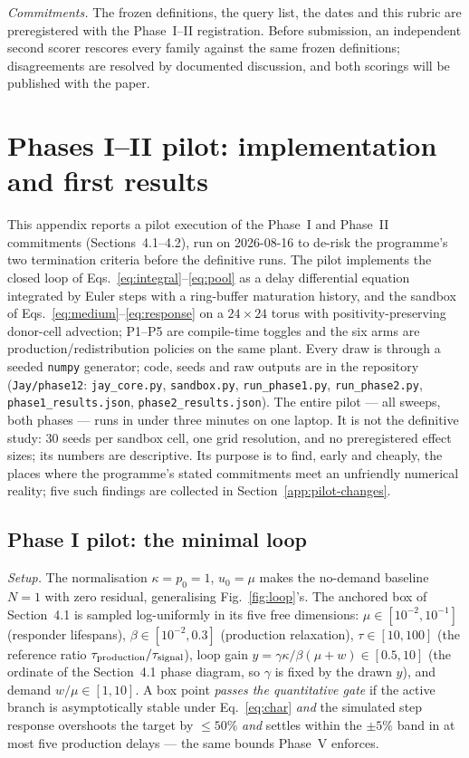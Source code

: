 \documentclass[twoside,twocolumn,usenatbib]{mnras}
\begin{document}
\emph{Commitments.} The frozen definitions, the query list, the dates
and this rubric are preregistered with the Phase~I--II registration.
Before submission, an independent second scorer rescores every family
against the same frozen definitions; disagreements are resolved by
documented discussion, and both scorings will be published with the
paper.

\section{Phases I--II pilot: implementation and first results}
\label{app:pilot}

This appendix reports a pilot execution of the Phase~I and Phase~II
commitments (Sections~4.1--4.2), run on 2026-08-16 to de-risk the
programme's two termination criteria before the definitive runs.  The
pilot implements the closed loop of Eqs.~\ref{eq:integral}--\ref{eq:pool}
as a delay differential equation integrated by Euler steps with a
ring-buffer maturation history, and the sandbox of
Eqs.~\ref{eq:medium}--\ref{eq:response} on a $24\times24$ torus with
positivity-preserving donor-cell advection; P1--P5 are compile-time
toggles and the six arms are production/redistribution policies on the
same plant.  Every draw is through a seeded \texttt{numpy} generator;
code, seeds and raw outputs are in the repository
(\texttt{Jay/phase12}: \texttt{jay\_core.py}, \texttt{sandbox.py},
\texttt{run\_phase1.py}, \texttt{run\_phase2.py},
\texttt{phase1\_results.json}, \texttt{phase2\_results.json}).  The
entire pilot --- all sweeps, both phases --- runs in under three
minutes on one laptop.  It is not the definitive study: 30 seeds per
sandbox cell, one grid resolution, and no preregistered effect sizes;
its numbers are descriptive.  Its purpose is to find, early and
cheaply, the places where the programme's stated commitments meet an
unfriendly numerical reality; five such findings are collected in
Section~\ref{app:pilot-changes}.

\subsection{Phase I pilot: the minimal loop}
\label{app:pilot-1}

\emph{Setup.}  The normalisation $\kappa = p_0 = 1$, $u_0 = \mu$
makes the no-demand baseline $N = 1$ with zero residual, generalising
Fig.~\ref{fig:loop}'s.  The anchored box of Section~4.1 is sampled
log-uniformly in its five free dimensions: $\mu \in [10^{-2},10^{-1}]$
(responder lifespans), $\beta \in [10^{-2},0.3]$ (production
relaxation), $\tau \in [10,100]$ (the reference ratio
$\tau_{\rm production}/\tau_{\rm signal}$), loop gain
$y = \gamma\kappa/\beta(\mu+w) \in [0.5,10]$ (the ordinate of the
Section~4.1 phase diagram, so $\gamma$ is fixed by the drawn $y$), and
demand $w/\mu \in [1,10]$.  A box point \emph{passes the quantitative
gate} if the active branch is asymptotically stable under
Eq.~\ref{eq:char} \emph{and} the simulated step response overshoots
the target by $\le 50\%$ \emph{and} settles within the $\pm5\%$ band
in at most five production delays --- the same bounds Phase~V
enforces.
\end{document}
